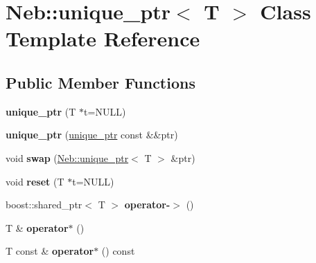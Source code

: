 \hypertarget{classNeb_1_1unique__ptr}{\section{\-Neb\-:\-:unique\-\_\-ptr$<$ \-T $>$ \-Class \-Template \-Reference}
\label{classNeb_1_1unique__ptr}
}
\subsection*{\-Public \-Member \-Functions}
\begin{DoxyCompactItemize}
\item 
\hypertarget{classNeb_1_1unique__ptr_ab549dc5789b1ec0786538fd93a1378cb}{{\bfseries unique\-\_\-ptr} (\-T $\ast$t=\-N\-U\-L\-L)}\label{classNeb_1_1unique__ptr_ab549dc5789b1ec0786538fd93a1378cb}

\item 
\hypertarget{classNeb_1_1unique__ptr_afa78e9899c9c748b5f269cd3b3ecb8fd}{{\bfseries unique\-\_\-ptr} (\hyperlink{classNeb_1_1unique__ptr}{unique\-\_\-ptr} const \&\&ptr)}\label{classNeb_1_1unique__ptr_afa78e9899c9c748b5f269cd3b3ecb8fd}

\item 
\hypertarget{classNeb_1_1unique__ptr_a3c9f699604852a570044b19a6984f096}{void {\bfseries swap} (\hyperlink{classNeb_1_1unique__ptr}{\-Neb\-::unique\-\_\-ptr}$<$ \-T $>$ \&ptr)}\label{classNeb_1_1unique__ptr_a3c9f699604852a570044b19a6984f096}

\item 
\hypertarget{classNeb_1_1unique__ptr_ae0e196e2210b06cd645da9030a51503a}{void {\bfseries reset} (\-T $\ast$t=\-N\-U\-L\-L)}\label{classNeb_1_1unique__ptr_ae0e196e2210b06cd645da9030a51503a}

\item 
\hypertarget{classNeb_1_1unique__ptr_aa488bf338cd935decccc66e2b9c96d0b}{boost\-::shared\-\_\-ptr$<$ \-T $>$ {\bfseries operator-\/$>$} ()}\label{classNeb_1_1unique__ptr_aa488bf338cd935decccc66e2b9c96d0b}

\item 
\hypertarget{classNeb_1_1unique__ptr_a6ae4dbac9aebd1c828de5427c6dec3d1}{\-T \& {\bfseries operator$\ast$} ()}\label{classNeb_1_1unique__ptr_a6ae4dbac9aebd1c828de5427c6dec3d1}

\item 
\hypertarget{classNeb_1_1unique__ptr_a12998af6b118be69691c6b000cc160ee}{\-T const \& {\bfseries operator$\ast$} () const }\label{classNeb_1_1unique__ptr_a12998af6b118be69691c6b000cc160ee}


\end{DoxyCompactItemize}
